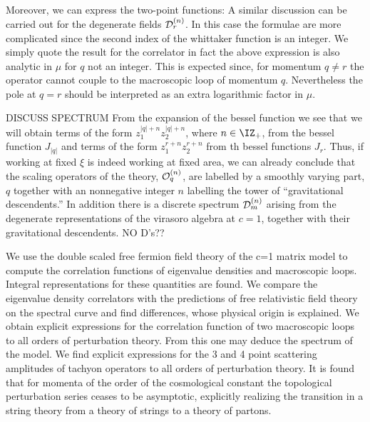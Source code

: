  
\listrefs
\listfigs
\bye





Moreover, 
we can express the two-point functions:
\eqn{}
A similar discussion can be carried out for the degenerate
fields ${\cal D}^{(n)}_r$. In this case the formulae are more complicated
since the second index of the whittaker function is an integer. 
We simply quote the result for the correlator
\eqn{}
in fact the above expression is also analytic in $\mu$ for $q$ not
an integer. This is expected since, for momentum $q\not= r$ 
the operator cannot couple to the macroscopic loop of 
momentum $q$. Nevertheless the pole at $q=r$ should be interpreted 
as an extra logarithmic factor in $\mu$.

DISCUSS SPECTRUM
From the expansion of the bessel 
function we see that we will obtain terms of the form $z_1^{|q|+n}
z_2^{|q|+n}$, where $n\in \IZ_+$, from the bessel function $J_{|q|}$
and terms of the form $z_1^{r+n}z_2^{r+n}$ from th bessel 
functions $J_r$. 
Thus, if working at fixed $\xi$ is indeed working at 
fixed area, we can already conclude that the scaling operators 
of the 
theory, ${\cal O}^{(n)}_{q}$, are labelled by
a smoothly varying part, $q$ together with an nonnegative
integer $n$ labelling the tower of ``gravitational descendents.'' 
In addition there is a discrete spectrum ${\cal D}_m^{(n)}$ 
arising from the degenerate representations of 
the virasoro algebra at $c=1$, together with their gravitational
descendents. NO D's??

We use the double scaled free fermion field theory of 
the c=1 matrix model to compute the correlation functions
of eigenvalue densities and macroscopic loops. Integral 
representations for these quantities are found. We compare
the eigenvalue density correlators with the predictions of 
free relativistic field theory on the spectral curve and 
find differences, whose physical origin is explained. 
We obtain explicit expressions for the correlation function
of two macroscopic loops to all orders of perturbation 
theory. From this one may deduce the spectrum of the model. 
We find explicit expressions for the 3 and 4 point scattering
amplitudes of tachyon operators to all orders of perturbation theory.
It is found that for momenta of the order of the cosmological
constant the topological perturbation series ceases to be asymptotic,
explicitly realizing the transition in a string theory from 
a theory of strings to a theory of partons.




 
 
 
 


